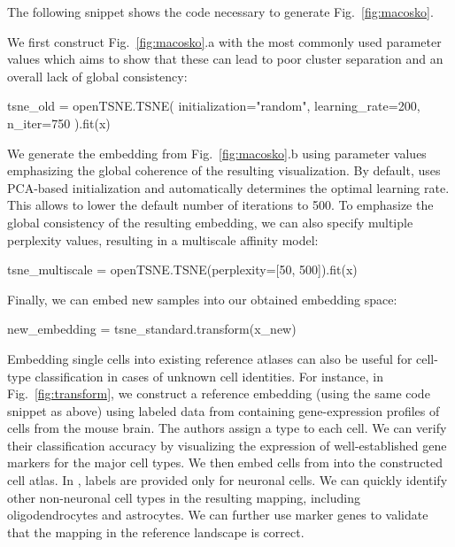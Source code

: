 \documentclass[article]{jss}
\newcommand{\opentsne}{\pkg{openTSNE}\xspace}
\begin{document}
The following snippet shows the code necessary to generate Fig.~\ref{fig:macosko}.

We first construct Fig.~\ref{fig:macosko}.a with the most commonly used parameter values which aims to show that these can lead to poor cluster separation and an overall lack of global consistency:
\begin{CodeChunk}
\begin{CodeInput}
tsne_old = openTSNE.TSNE(
    initialization="random", learning_rate=200, n_iter=750
).fit(x)
\end{CodeInput}
\end{CodeChunk}
We generate the embedding from Fig.~\ref{fig:macosko}.b using parameter values emphasizing the global coherence of the resulting visualization. By default, \opentsne uses PCA-based initialization and automatically determines the optimal learning rate. This allows \opentsne to lower the default number of iterations to 500. To emphasize the global consistency of the resulting embedding, we can also specify multiple perplexity values, resulting in a multiscale affinity model:
\begin{CodeChunk}
\begin{CodeInput}
tsne_multiscale = openTSNE.TSNE(perplexity=[50, 500]).fit(x)
\end{CodeInput}
\end{CodeChunk}

Finally, we can embed new samples into our obtained embedding space:
\begin{CodeChunk}
\begin{CodeInput}
new_embedding = tsne_standard.transform(x_new)
\end{CodeInput}
\end{CodeChunk}

Embedding single cells into existing reference atlases can also be useful for cell-type classification in cases of unknown cell identities. For instance, in Fig.~\ref{fig:transform}, we construct a reference embedding (using the same code snippet as above) using labeled data from \citet{hochgerner2018conserved} containing gene-expression profiles of cells from the mouse brain. The authors assign a type to each cell. We can verify their classification accuracy by visualizing the expression of well-established gene markers for the major cell types. We then embed cells from \citet{harris2018classes} into the constructed cell atlas. In \citet{harris2018classes}, labels are provided only for neuronal cells. We can quickly identify other non-neuronal cell types in the resulting mapping, including oligodendrocytes and astrocytes. We can further use marker genes to validate that the mapping in the reference landscape is correct.
\end{document}
